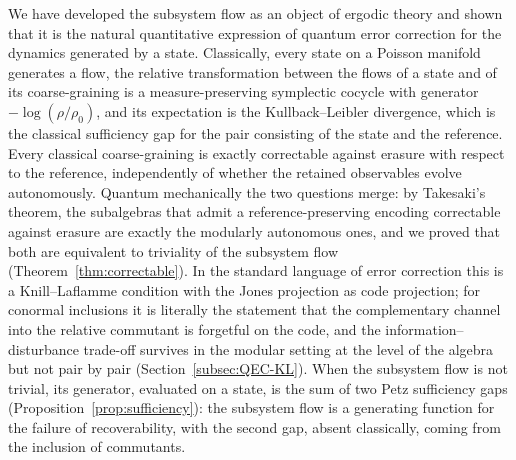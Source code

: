 \documentclass[a4paper,11pt]{article}
\theoremstyle{definition}
\begin{document}
We have developed the subsystem flow as an object of ergodic theory and shown that it is the natural quantitative expression of quantum error correction for the dynamics generated by a state. Classically, every state on a Poisson manifold generates a flow, the relative transformation between the flows of a state and of its coarse-graining is a measure-preserving symplectic cocycle with generator $-\log(\rho/\rho_0)$, and its expectation is the Kullback--Leibler divergence, which is the classical sufficiency gap for the pair consisting of the state and the reference. Every classical coarse-graining is exactly correctable against erasure with respect to the reference, independently of whether the retained observables evolve autonomously. Quantum mechanically the two questions merge: by Takesaki's theorem, the subalgebras that admit a reference-preserving encoding correctable against erasure are exactly the modularly autonomous ones, and we proved that both are equivalent to triviality of the subsystem flow (Theorem~\ref{thm:correctable}). In the standard language of error correction this is a Knill--Laflamme condition with the Jones projection as code projection; for conormal inclusions it is literally the statement that the complementary channel into the relative commutant is forgetful on the code, and the information--disturbance trade-off survives in the modular setting at the level of the algebra but not pair by pair (Section~\ref{subsec:QEC-KL}). When the subsystem flow is not trivial, its generator, evaluated on a state, is the sum of two Petz sufficiency gaps (Proposition~\ref{prop:sufficiency}): the subsystem flow is a generating function for the failure of recoverability, with the second gap, absent classically, coming from the inclusion of commutants.
\end{document}
